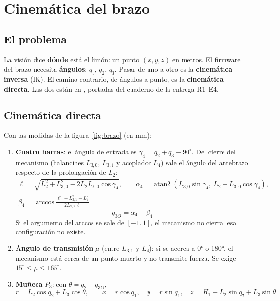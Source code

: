 \chapter{Cinemática del brazo}\label{cap:ik}

\section{El problema}

La visión dice \textbf{dónde} está el limón: un punto $(x, y, z)$ en metros. El firmware del brazo necesita
\textbf{ángulos}: $q_1$, $q_2$, $q_3$. Pasar de uno a otro es la \textbf{cinemática inversa} (IK). El camino contrario,
de ángulos a punto, es la \textbf{cinemática directa}. Las dos están en
, portadas del cuaderno de la entrega R1~E4.

\section{Cinemática directa}

Con las medidas de la figura~\ref{fig:brazo} (en mm):

\begin{enumerate}
  \item \textbf{Cuatro barras}: el ángulo de entrada es $\gamma_4 = q_2 + q_3 - 90^\circ$. Del cierre del mecanismo
        (balancines $L_{3,0}$, $L_{3,1}$ y acoplador $L_4$) sale el ángulo del antebrazo respecto de la prolongación de
        $L_2$:
        \begin{gather*}
          \ell = \sqrt{L_2^2 + L_{3,0}^2 - 2 L_2 L_{3,0} \cos\gamma_4}, \qquad
          \alpha_4 = \operatorname{atan2}\!\left(L_{3,0}\sin\gamma_4,\ L_2 - L_{3,0}\cos\gamma_4\right), \\
          \beta_4 = \arccos\frac{\ell^2 + L_{3,1}^2 - L_4^2}{2 L_{3,1}\,\ell}
        \end{gather*}
        \[ q_{3O} = \alpha_4 - \beta_4 \]
        Si el argumento del arccos se sale de $[-1, 1]$, el mecanismo no cierra: esa configuración no existe.
  \item \textbf{Ángulo de transmisión} $\mu$ (entre $L_{3,1}$ y $L_4$): si se acerca a 0° o 180°, el mecanismo está
        cerca de un punto muerto y no transmite fuerza. Se exige $15^\circ \leq \mu \leq 165^\circ$.
  \item \textbf{Muñeca} $P_3$: con $\theta = q_2 + q_{3O}$,
        \[
          r = L_2\cos q_2 + L_3\cos\theta, \qquad
          x = r\cos q_1, \quad y = r\sin q_1, \quad z = H_1 + L_2\sin q_2 + L_3\sin\theta
        \]
\end{enumerate}

